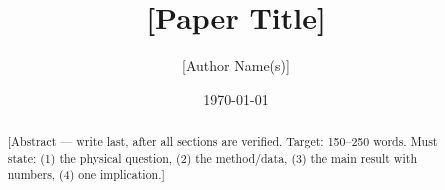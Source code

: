\documentclass[12pt,letterpaper]{article}
\title{[Paper Title]}
\author{[Author Name(s)] \\ [Institution]}
\date{\today}
\begin{document}
\maketitle

\begin{abstract}
[Abstract — write last, after all sections are verified.
Target: 150–250 words.
Must state: (1) the physical question, (2) the method/data, (3) the main result with numbers, (4) one implication.]
\end{abstract}

\tableofcontents
\newpage









\end{document}
